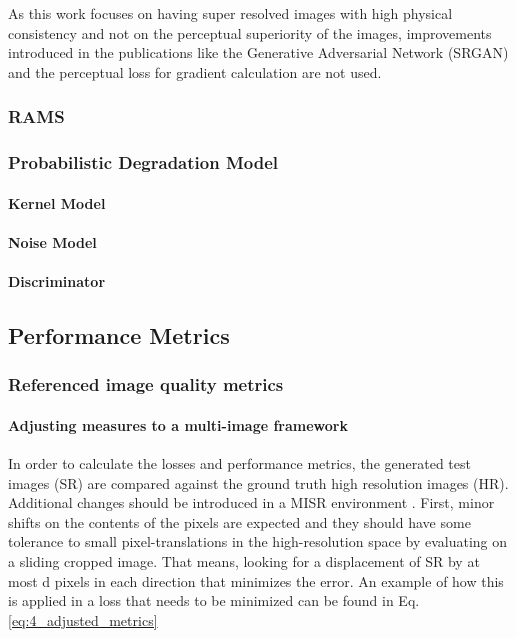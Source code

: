         As this work focuses on having super resolved images with high physical consistency and not on the perceptual superiority of the images, improvements introduced in the publications like the Generative Adversarial Network (SRGAN)  and the perceptual loss for gradient calculation are not used.
    

        \subsubsection{RAMS}
        \subsubsection{Probabilistic Degradation Model}

            \paragraph{Kernel Model}
            \paragraph{Noise Model}
            \paragraph{Discriminator}


    \subsection{Performance Metrics}

        \subsubsection{Referenced image quality metrics}

        
        
    
            \paragraph{Adjusting measures to a multi-image framework}
    
            In order to calculate the losses and performance metrics, the generated test images (SR) are compared against the ground truth high resolution images (HR). Additional changes should be introduced in a MISR environment \cite{märtens2019superresolution}. First, minor shifts on the contents of the pixels are expected and they should have some tolerance to small pixel-translations in the high-resolution space by evaluating on a sliding cropped image. That means, looking for a displacement of SR by at most d pixels in each direction that minimizes the error. An example of how this is applied in a loss that needs to be minimized can be found in Eq. \ref{eq:4_adjusted_metrics}
    
